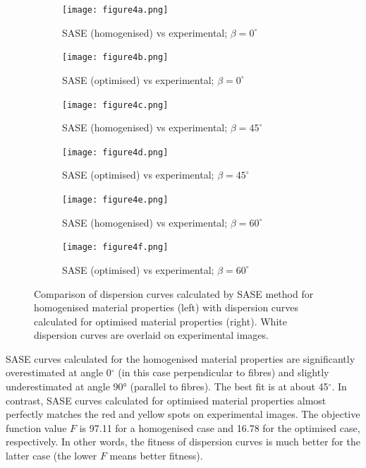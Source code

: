 \documentclass[preprint,12pt]{elsarticle}
\begin{document}
\begin{figure} [h!]
	\centering
	\begin{subfigure}[b]{0.47\textwidth}
		\centering
		\texttt{[image: figure4a.png]}
		\caption{SASE (homogenised) vs experimental; $\beta=0^{\circ}$}
		\label{fig:dispersion0deg_homog}
	\end{subfigure}
	\hfill
	\begin{subfigure}[b]{0.47\textwidth}
		\centering
		\texttt{[image: figure4b.png]}
		\caption{SASE (optimised) vs experimental; $\beta=0^{\circ}$}
		\label{fig:dispersion0deg_opt}
	\end{subfigure}
	\hfill
	\begin{subfigure}[b]{0.47\textwidth}
		\centering
		\texttt{[image: figure4c.png]}
		\caption{SASE (homogenised) vs experimental; $\beta=45^{\circ}$}
		\label{fig:dispersion45deg_homog}
	\end{subfigure}
	\hfill
	\begin{subfigure}[b]{0.47\textwidth}
		\centering
		\texttt{[image: figure4d.png]}
		\caption{SASE (optimised) vs experimental; $\beta=45^{\circ}$}
		\label{fig:dispersion45deg_opt}
	\end{subfigure}
	\hfill
	\begin{subfigure}[b]{0.47\textwidth}
		\centering
		\texttt{[image: figure4e.png]}
		\caption{SASE (homogenised) vs experimental; $\beta=60^{\circ}$}
		\label{fig:dispersion60deg_homog}
	\end{subfigure}
	\hfill
	\begin{subfigure}[b]{0.47\textwidth}
		\centering
		\texttt{[image: figure4f.png]}
		\caption{SASE (optimised) vs experimental; $\beta=60^{\circ}$}
		\label{fig:dispersion60deg_opt}
	\end{subfigure}
	\caption{Comparison of dispersion curves calculated by SASE method for homogenised material properties (left) with dispersion curves calculated for optimised material properties (right). White dispersion curves are overlaid on experimental images.}
	\label{fig:homog_opt}
\end{figure}

SASE curves calculated for the homogenised material properties are significantly overestimated at angle 0\(^{\circ}\) (in this case perpendicular to fibres) and slightly underestimated at angle 90° (parallel to fibres). 
The best fit is at about 45\(^{\circ}\). 
In contrast, SASE curves calculated for optimised material properties almost perfectly matches the red and yellow spots on experimental images. 
The objective function value $F$ is 97.11 for a homogenised case and 16.78 for the optimised case, respectively. 
In other words, the fitness of dispersion curves is much better for the latter case (the lower $F$ means better fitness).
\end{document}
